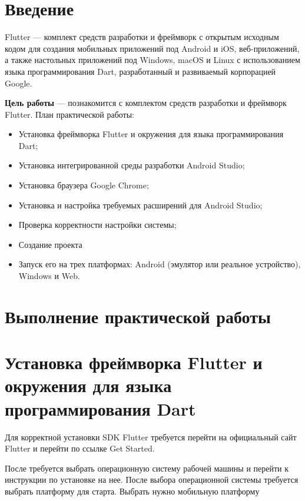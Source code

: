 \section*{\LARGE Введение}

Flutter — комплект средств разработки и фреймворк с открытым исходным кодом для создания мобильных приложений под Android и iOS,
веб-приложений, а также настольных приложений под Windows, macOS и Linux с использованием языка программирования Dart,
разработанный и развиваемый корпорацией Google.

\textbf{Цель работы} --- познакомится с комплектом средств разработки и фреймворк Flutter.
План практической работы:
\begin{itemize}
	\item Установка фреймворка Flutter
	и окружения для языка программирования Dart;
	\item Установка интегрированной среды разработки Android Studio;
	\item Установка браузера Google Chrome;
	\item Установка и настройка требуемых расширений для Android Studio;
	\item Проверка корректности настройки системы;
	\item Создание проекта
	\item Запуск его на трех платформах:
	Android (эмулятор или реальное устройство), Windows и Web.
\end{itemize}

\clearpage

\section*{\LARGE Выполнение практической работы}

\section{Установка фреймворка Flutter и окружения для языка программирования Dart}

Для корректной установки SDK Flutter требуется перейти на официальный сайт Flutter и
перейти по ссылке Get Started.

После требуется выбрать операционную систему рабочей машины и перейти к инструкции
по установке на нее.
После выбора операционной системы требуется выбрать платформу для старта.
Выбрать нужно мобильную платформу

